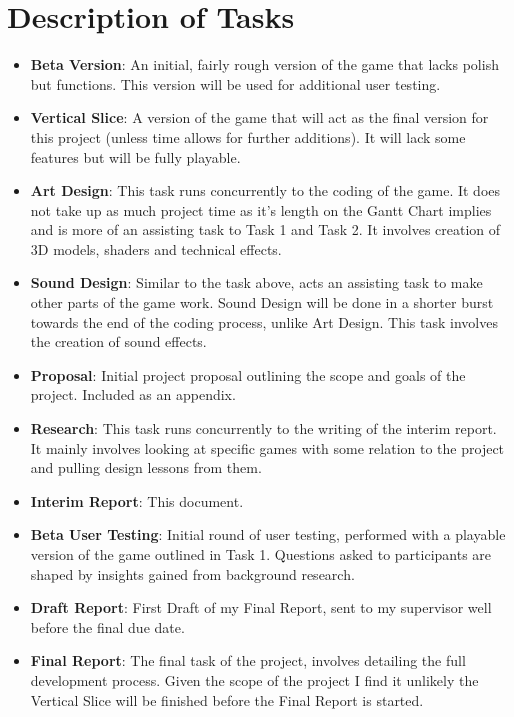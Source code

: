 \documentclass{report}
\begin{document}
\section{Description of Tasks}

\begin{itemize}
  \item \textbf{Beta Version}: An initial, fairly rough version of the game that lacks polish but functions. This version will be used for additional user testing.
  \item \textbf{Vertical Slice}: A version of the game that will act as the final version for this project (unless time allows for further additions). It will lack some features but will be fully playable.
  \item \textbf{Art Design}: This task runs concurrently to the coding of the game. It does not take up as much project time as it's length on the Gantt Chart implies and is more of an assisting task to Task 1 and Task 2. It involves creation of 3D models, shaders and technical effects.
  \item \textbf{Sound Design}: Similar to the task above, acts an assisting task to make other parts of the game work. Sound Design will be done in a shorter burst towards the end of the coding process, unlike Art Design. This task involves the creation of sound effects.
  \item \textbf{Proposal}: Initial project proposal outlining the scope and goals of the project. Included as an appendix.
  \item \textbf{Research}: This task runs concurrently to the writing of the interim report. It mainly involves looking at specific games with some relation to the project and pulling design lessons from them.
  \item \textbf{Interim Report}: This document.
  \item \textbf{Beta User Testing}: Initial round of user testing, performed with a playable version of the game outlined in Task 1. Questions asked to participants are shaped by insights gained from background research.
  \item \textbf{Draft Report}: First Draft of my Final Report, sent to my supervisor well before the final due date.
  \item \textbf{Final Report}: The final task of the project, involves detailing the full development process. Given the scope of the project I find it unlikely the Vertical Slice will be finished before the Final Report is started.
\end{itemize}
\end{document}
